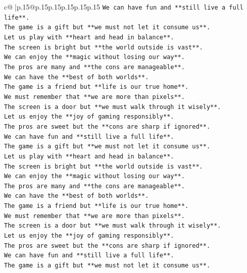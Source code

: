 \documentclass{article}
\begin{document}
{\begin{supertabular}{c@{$\;$}|p{.15\linewidth}@{}p{.15\linewidth}p{.15\linewidth}p{.15\linewidth}p{.15\linewidth}p{.15\linewidth}}
{{{\texttt{We can have fun and **still live a full life**.} \\
\texttt{The game is a gift but **we must not let it consume us**.} \\
\texttt{Let us play with **heart and head in balance**.} \\
\texttt{The screen is bright but **the world outside is vast**.} \\
\texttt{We can enjoy the **magic without losing our way**.} \\
\texttt{The pros are many and **the cons are manageable**.} \\
\texttt{We can have the **best of both worlds**.} \\
\texttt{The game is a friend but **life is our true home**.} \\
\texttt{We must remember that **we are more than pixels**.} \\
\texttt{The screen is a door but **we must walk through it wisely**.} \\
\texttt{Let us enjoy the **joy of gaming responsibly**.} \\
\texttt{The pros are sweet but the **cons are sharp if ignored**.} \\
\texttt{We can have fun and **still live a full life**.} \\
\texttt{The game is a gift but **we must not let it consume us**.} \\
\texttt{Let us play with **heart and head in balance**.} \\
\texttt{The screen is bright but **the world outside is vast**.} \\
\texttt{We can enjoy the **magic without losing our way**.} \\
\texttt{The pros are many and **the cons are manageable**.} \\
\texttt{We can have the **best of both worlds**.} \\
\texttt{The game is a friend but **life is our true home**.} \\
\texttt{We must remember that **we are more than pixels**.} \\
\texttt{The screen is a door but **we must walk through it wisely**.} \\
\texttt{Let us enjoy the **joy of gaming responsibly**.} \\
\texttt{The pros are sweet but the **cons are sharp if ignored**.} \\
\texttt{We can have fun and **still live a full life**.} \\
\texttt{The game is a gift but **we must not let it consume us**.} \\
}}}
\end{supertabular}}
\end{document}
